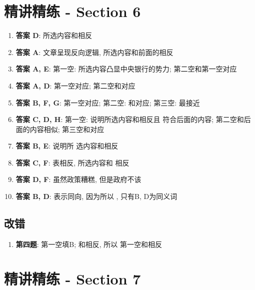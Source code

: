 \section{精讲精练 - Section 6}

  \begin{enumerate}
    \item \textbf{答案 D}: 所选内容和相反
    \item \textbf{答案 A}: 文章呈现反向逻辑, 所选内容和前面的相反
    \item \textbf{答案 A, E}: 第一空: 所选内容凸显中央银行的势力; 第二空和第一空对应
    \item \textbf{答案 A, D}: 第一空对应;
    第二空和对应
    \item \textbf{答案 B, F, G}: 第一空对应; 第二空:
    和对应; 第三空: 最接近
    \item \textbf{答案 C, D, H}: 第一空: 说明所选内容和相反且
    符合后面的内容; 第二空和后面的内容相似; 第三空和对应
    \item \textbf{答案 B, E}: 说明所
    选内容和相反
    \item \textbf{答案 C, F}: 表相反, 所选内容和
    相反
    \item \textbf{答案 D, F}: 虽然政策糟糕, 但是政府不该
    \item \textbf{答案 B, D}: 表示同向, 因为所以
    , 只有B, D为同义词
  \end{enumerate}

  \subsection{改错}

    \begin{enumerate}
      \item \textbf{第四题}: 第一空填B; 和相反, 所以
      第一空和相反
    \end{enumerate}

\section{精讲精练 - Section 7}

